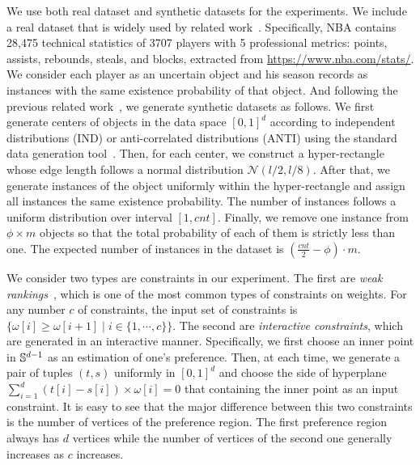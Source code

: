 We use both real dataset and synthetic datasets for the experiments.
We include a real dataset that is widely used by related work~\cite{DBLP:conf/vldb/PeiJLY07, DBLP:journals/tkde/KimIP12, DBLP:journals/ijon/YangLZMG18}.
Specifically, \textsc{NBA} contains 28,475 technical statistics of 3707 players with 5 professional metrics: points, assists, rebounds, steals, and blocks, extracted from \url{https://www.nba.com/stats/}.
We consider each player as an uncertain object and his season records as instances with the same existence probability of that object.
And following the previous related work~\cite{DBLP:conf/vldb/PeiJLY07, DBLP:conf/pods/AtallahQ09, DBLP:journals/tkde/KimIP12}, we generate synthetic datasets as follows.
We first generate centers of objects in the data space $[0, 1]^d$ according to independent distributions (\textsc{IND}) or anti-correlated distributions (\textsc{ANTI}) using the standard data generation tool~\cite{DBLP:conf/icde/BorzsonyiKS01}.
Then, for each center, we construct a hyper-rectangle whose edge length follows a normal distribution $\mathscr{N}(l/2, l/8)$.
After that, we generate instances of the object uniformly within the hyper-rectangle and assign all instances the same existence probability.
The number of instances follows a uniform distribution over interval $[1, cnt]$.
Finally, we remove one instance from $\phi \times m$ objects so that the total probability of each of them is strictly less than one.
The expected number of instances in the dataset is $(\frac{cnt}{2} - \phi)\cdot m$.

We consider two types are constraints in our experiment.
The first are \textit{weak rankings}~\cite{DBLP:journals/pvldb/CiacciaM17}, which is one of the most common types of constraints on weights.
For any number $c$ of constraints, the input set of constraints is $\{\omega[i] \ge \omega[i + 1] \mid i \in \{1, \cdots, c\}\}$.
The second are \textit{interactive constraints}, which are generated in an interactive manner.
Specifically, we first choose an inner point in $\mathbb{S}^{d-1}$ as an estimation of one's preference.
Then, at each time, we generate a pair of tuples $(t, s)$ uniformly in $[0, 1]^d$ and choose the side of hyperplane $\sum^d_{i = 1}(t[i] - s[i]) \times \omega[i] = 0$ that containing the inner point as an input constraint.
It is easy to see that the major difference between this two constraints is the number of vertices of the preference region.
The first preference region always has $d$ vertices while the number of vertices of the second one generally increases as $c$ increases.

